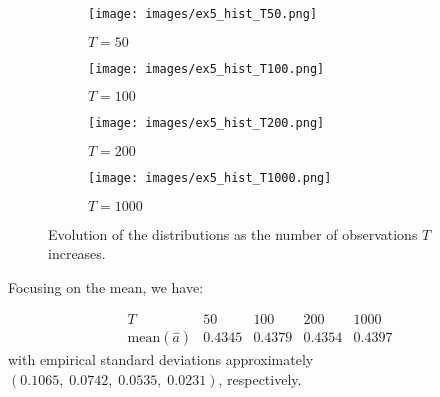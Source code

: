 \documentclass[dvipsnames,11pt]{article}
\begin{document}
\begin{solution}
        \begin{figure}[h]
                     \centering
                     \begin{subfigure}[b]{0.49\textwidth}
                         \centering
                         \texttt{[image: images/ex5\_hist\_T50.png]}
                         \caption{\(T=50\)}
                         \label{fig:ex4_hist_T50}                         
                     \end{subfigure}
                     \hfill
                     \begin{subfigure}[b]{0.49\textwidth}
                         \centering
                         \texttt{[image: images/ex5\_hist\_T100.png]}
                         \caption{\(T=100\)}
                         \label{fig:ex2_path_after_burnin}
                     \end{subfigure}
                     \hfill
                     \begin{subfigure}[b]{0.49\textwidth}
                         \centering
                         \texttt{[image: images/ex5\_hist\_T200.png]}
                         \caption{\(T=200\)}
                         \label{fig:ex2_path_after_burnin}
                     \end{subfigure}
                     \hfill
                     \begin{subfigure}[b]{0.49\textwidth}
                         \centering
                         \texttt{[image: images/ex5\_hist\_T1000.png]}
                         \caption{\(T=1000\)}
                         \label{fig:ex2_path_after_burnin}
                     \end{subfigure}
                    \label{fig:ex_1c}
                    \caption{Evolution of the distributions as the number of observations \(T\) increases.}
                \end{figure}

\newpage

        Focusing on the mean, we have:

        \[
        \begin{array}{r|cccc}
        T & 50 & 100 & 200 & 1000\\\hline
        \mathrm{mean}(\hat a) & 0.4345 & 0.4379 & 0.4354 & 0.4397
        \end{array}
        \]
        with empirical standard deviations approximately $(0.1065,\;0.0742,\;0.0535,\;0.0231)$, respectively.


\end{solution}
\end{document}
